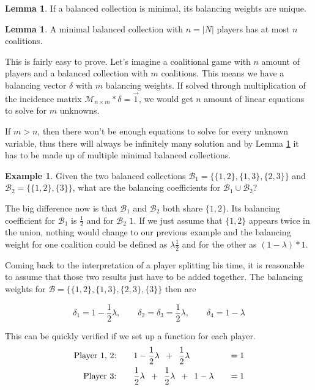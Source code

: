 \documentclass[10pt,a4paper,titlepage]{article}
\theoremstyle{plain}
\theoremstyle{definition}
\newtheorem{example}[thm]{Example} %
\newtheorem{lemma}[thm]{Lemma}
\begin{document}
\begin{lemma}\label{lem:minimalunique}
    If a balanced collection is minimal, its balancing weights are unique.
\end{lemma}

\begin{lemma}
    A minimal balanced collection with $n = |N|$ players has at most $n$ coalitions.
\end{lemma}

This is fairly easy to prove. Let's imagine a coalitional game with $n$ amount of players and a balanced collection with $m$ coalitions. This means we have a balancing vector $\delta$ with $m$ balancing weights. If solved through multiplication of the incidence matrix $\mathcal{M}_{n \times m}*\delta = \vec{1}$, we would get $n$ amount of linear equations to solve for $m$ unknowns.

If $m > n$, then there won't be enough equations to solve for every unknown variable, thus there will always be infinitely many solution and by Lemma \ref{lem:minimalunique} it has to be made up of multiple minimal balanced collections.

\begin{example}\label{ex:twounion}
    Given the two balanced collections $\mathcal{B}_1 = \{\{1, 2\}, \{1, 3\}, \{2, 3\}\}$ and $\mathcal{B}_2 = \{\{1, 2\}, \{3\}\}$, what are the balancing coefficients for $\mathcal{B}_1 \cup \mathcal{B}_2$?

    The big difference now is that $\mathcal{B}_1$ and $\mathcal{B}_2$ both share $\{1, 2\}$. Its balancing coefficient for $\mathcal{B}_1$ is $\frac{1}{2}$ and for $\mathcal{B}_2$ $1$. If we just assume that $\{1, 2\}$ appears twice in the union, nothing would change to our previous example and the balancing weight for one coalition could be defined as $\lambda \frac{1}{2}$ and for the other as $(1 - \lambda) * 1$.

    Coming back to the interpretation of a player splitting his time, it is reasonable to assume that those two results just have to be added together. The balancing weights for $\mathcal{B} = \{\{1, 2\}, \{1, 3\}, \{2, 3\}, \{3\}\}$ then are

    \begin{equation*}
        \delta_1 = 1 - \frac{1}{2}\lambda,\qquad \delta_2 = \delta_3 = \frac{1}{2}\lambda,\qquad \delta_4 = 1 - \lambda
    \end{equation*}

    This can be quickly verified if we set up a function for each player.
    \begin{alignat*}{2}
        \text{Player 1, 2:}\qquad &1 - \frac{1}{2}\lambda\enskip +\enskip \frac{1}{2}\lambda &\quad= 1\\
        \text{Player 3:}\qquad &\frac{1}{2}\lambda\enskip  + \enskip \frac{1}{2}\lambda \enskip + \enskip 1 - \lambda &\quad= 1
    \end{alignat*}
\end{example}
\end{document}
